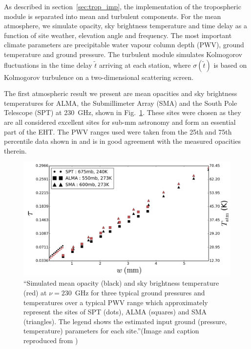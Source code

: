 As described in section~\ref{sec:trop_imp}, the implementation of the tropospheric module is separated into mean and turbulent components. For the mean atmosphere, we simulate opacity, sky brightness temperature and time delay as a function of site weather, elevation angle and frequency. The most important climate parameters are precipitable water vapour column depth (PWV), ground temperature and ground pressure. The turbulent module simulates Kolmogorov fluctuations in the time delay $\tilde{t}$ arriving at each station, where $\sigma(\tilde{t})$ is based on Kolmogorov turbulence on a two-dimensional scattering screen.


The first atmospheric result we present are mean opacities and sky brightness temperatures for ALMA, the Submillimeter Array (SMA) and the South Pole Telescope (SPT) at 230~GHz, shown in Fig.~\ref{fig:mean_atm}. These sites were chosen as they are all considered excellent sites for sub-mm astronomy and form an essential part of the EHT. The PWV ranges used were taken from the 25th and 75th percentile data shown in \citet{Lane_1998} and is in good agreement with the measured opacities therein. %

\begin{figure}[h!]
\includegraphics[width=1.\columnwidth]{Images/opacity}
\caption[Simulated mean opacity and sky brightness temperature  at $\nu =230$~GHz  for three typical ground pressures and temperatures over a typical PWV range which approximately represent the sites of SPT, ALMA  and SMA.]{``Simulated mean opacity (black) and sky brightness temperature (red) at $\nu =230$~GHz  for three typical ground pressures and temperatures over a typical PWV range \citep{Lane_1998} which approximately represent the sites of SPT (dots), ALMA (squares) and SMA (triangles). The legend shows the estimated input ground (pressure, temperature) parameters for each site.''(Image and caption reproduced from \citet{Blecher_2016})\label{fig:mean_atm}%
}
\end{figure}

